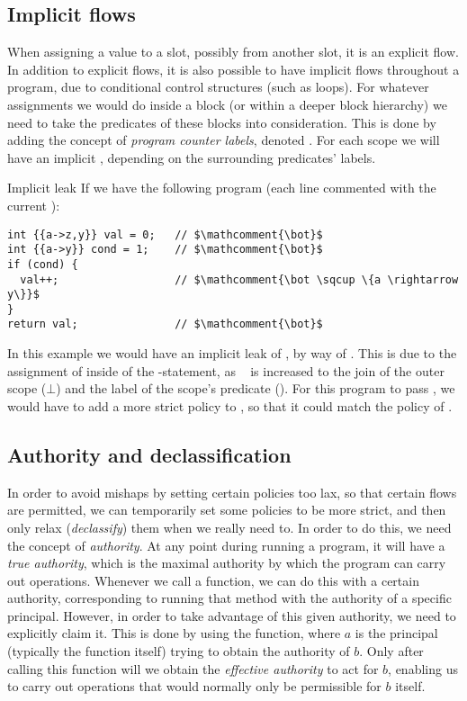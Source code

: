 \subsection{Implicit flows}
When assigning a value to a slot, possibly from another slot, it is an explicit flow.
In addition to explicit flows, it is also possible to have implicit flows throughout a program, due to conditional control structures (such as loops).
For whatever assignments we would do inside a block (or within a deeper block hierarchy) we need to take the predicates of these blocks into consideration.
This is done by adding the concept of \emph{program counter labels}, denoted \dlmpc.
For each scope we will have an implicit \dlmpc, depending on the surrounding predicates' labels.

\begin{example}{Implicit leak}\label{dlm:ex:implicit_leak}
  If we have the following program (each line commented with the current \dlmpc):
  \begin{lstlisting}[style=dlmc]
int {{a->z,y}} val = 0;   // $\mathcomment{\bot}$
int {{a->y}} cond = 1;    // $\mathcomment{\bot}$
if (cond) {
  val++;                  // $\mathcomment{\bot \sqcup \{a \rightarrow y\}}$
}
return val;               // $\mathcomment{\bot}$
  \end{lstlisting}
  In this example we would have an implicit leak of , by way of .
  This is due to the assignment of  inside of the -statement, as \dlmpc~ is increased to the join of the outer scope ($\bot$) and the label of the scope's predicate ().
  For this program to pass \thetool, we would have to add a more strict policy to , so that it could match the policy of .
\end{example}

\subsection{Authority and declassification}
In order to avoid mishaps by setting certain policies too lax, so that certain flows are permitted, we can temporarily set some policies to be more strict, and then only relax (\emph{declassify}) them when we really need to.
In order to do this, we need the concept of \emph{authority}.
At any point during running a program, it will have a \emph{true authority}, which is the maximal authority by which the program can carry out operations.
Whenever we call a function, we can do this with a certain authority, corresponding to running that method with the authority of a specific principal.
However, in order to take advantage of this given authority, we need to explicitly claim it.
This is done by using the \dlmactsfor{} function, where $a$ is the principal (typically the function itself) trying to obtain the authority of $b$.
Only after calling this function will we obtain the \emph{effective authority} to act for $b$, enabling us to carry out operations that would normally only be permissible for $b$ itself.

